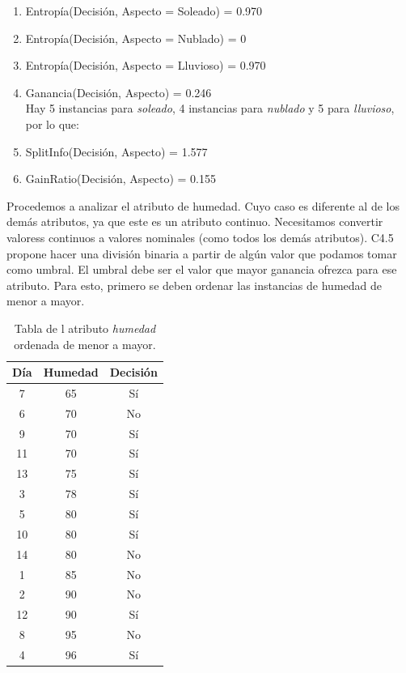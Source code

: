 \begin{UClist}
	\begin{enumerate}
		\item Entropía(Decisión, Aspecto = Soleado) = 0.970\\
		\item Entropía(Decisión, Aspecto = Nublado) = 0\\
		\item Entropía(Decisión, Aspecto = Lluvioso) = 0.970\\
		\item Ganancia(Decisión, Aspecto) = 0.246\\
		Hay 5 instancias para \emph{soleado}, 4 instancias para \emph{nublado} y 5 para \emph{lluvioso}, por lo que:\\
		\item SplitInfo(Decisión, Aspecto) = 1.577\\
		\item GainRatio(Decisión, Aspecto) = 0.155\\
	\end{enumerate}

	\UCli Procedemos a analizar el atributo de humedad. Cuyo caso es diferente al de los demás atributos, ya que este es un atributo continuo. Necesitamos convertir valoress continuos a valores nominales (como todos los demás atributos). C4.5 propone hacer una división binaria a partir de algún valor que podamos tomar como umbral. El umbral debe ser el valor que mayor ganancia ofrezca para ese atributo. Para esto, primero se deben ordenar las instancias de humedad de menor a mayor.\\

	\begin{table}[H]
		\begin{center}
			\label{tab:tablaInduccionC4.5Humedad}
			\begin{tabular}{c|c|c}
				\textbf{Día} & \textbf{Humedad} & \textbf{Decisión}\\
				\hline
				7 & 65 & Sí\\
				6 & 70 & No\\
				9 & 70 & Sí\\
				11 & 70 & Sí\\
				13 & 75 & Sí\\
				3 & 78 & Sí\\
				5 & 80 & Sí\\
				10 & 80 & Sí\\
				14 & 80 & No\\
				1 & 85 & No\\
				2 & 90 & No\\
				12 & 90 & Sí\\
				8 & 95 & No\\
				4 & 96 & Sí\\
			\end{tabular}
		\end{center}
		\caption{Tabla de l atributo \emph{humedad} ordenada de menor a mayor.}
	\end{table}


\end{UClist}
